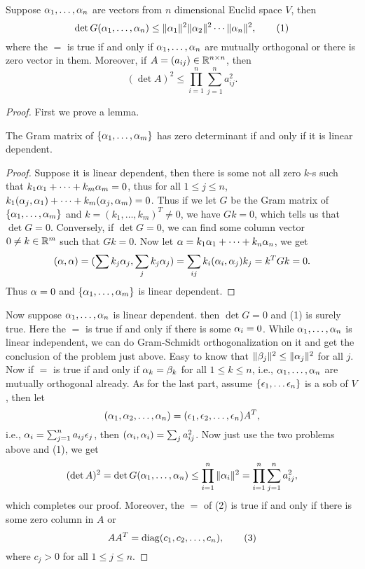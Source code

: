 \begin{pro}%
	Suppose $\alpha_1,\dots,\alpha_n$ are vectors from $n$ dimensional Euclid space $V$, then
	\[\det G(\alpha_1,\dots,\alpha_n)\leq \|\alpha_1\|^2\|\alpha_2\|^2\cdots\|\alpha_n\|^2,\tag{1}\]
	where the $=$ is true if and only if $\alpha_1,\dots,\alpha_n$ are mutually orthogonal or there is zero vector in them. Moreover, if $A=(a_{ij})\in \mathbb{R}^{n\times n}$, then
	\[(\det A)^2\leq \prod_{i=1}^n\sum_{j=1}^n a_{ij}^2.\tag{2}\]
\end{pro}
\begin{proof}
	First we prove a lemma.
	\begin{lem}
		The Gram matrix of $\{\alpha_1,\dots,\alpha_m\}$ has zero determinant if and only if it is linear dependent.
	\end{lem}
	\begin{proof}
		Suppose it is linear dependent, then there is some not all zero $k$-s such that $k_1\alpha_1+\dots+k_m\alpha_m=0$, thus for all $1\leq j\leq n$, $k_1(\alpha_j,\alpha_1)+\dots+k_m(\alpha_j,\alpha_m)=0$. Thus if we let $G$ be the Gram matrix of $\{\alpha_1,\dots,\alpha_m\}$ and $k=(k_1,\dots,k_m)^T\neq 0$, we have $Gk=0$, which tells us that $\det G=0$. Conversely, if $\det G=0$, we can find some column vector $0\neq k\in \mathbb{R}^m$ such that $Gk=0$. Now let $\alpha=k_1\alpha_1+\dots+k_n\alpha_n$, we get 
		\[(\alpha,\alpha)=(\sum k_j \alpha_j,\sum_j k_j \alpha_j)=\sum_{ij} k_i(\alpha_i,\alpha_j)k_j=k^TGk=0.\]
		Thus $\alpha=0$ and $\{\alpha_1,\dots,\alpha_m\}$ is linear dependent.
	\end{proof}
	Now suppose $\alpha_1,\dots,\alpha_n$ is linear dependent. then $\det G=0$ and (1) is surely true. Here the $=$ is true if and only if there is some $\alpha_i=0$. While $\alpha_1,\dots,\alpha_n$ is linear independent, we can do Gram-Schmidt orthogonalization on it and get the conclusion of the problem just above. Easy to know that $\|\beta_j\|^2\leq \|\alpha_j\|^2$ for all $j$. Now if $=$ is true if and only if $\alpha_k=\beta_k$ for all $1\leq k\leq n$, i.e., $\alpha_1,\dots,\alpha_n$ are mutually orthogonal already. As for the last part, assume $\{\epsilon_1,\dots\epsilon_n\}$ is a sob of $V$, then let
	\[(\alpha_1,\alpha_2,\dots,\alpha_n)=(\epsilon_1,\epsilon_2,\dots,\epsilon_n)A^T,\]
	i.e., $\alpha_i=\sum_{j=1}^n a_{ij} \epsilon_j$, then $(\alpha_i,\alpha_i)=\sum_j a_{ij}^2$. Now just use the two problems above and (1), we get  
	\[(\det A)^2=\det G(\alpha_1,\dots,\alpha_n)\leq \prod_{i=1}^n \|\alpha_i\|^2=\prod_{i=1}^n\sum_{j=1}^n a_{ij}^2,\]
	which completes our proof. Moreover, the $=$ of (2) is true if and only if there is some zero column in $A$ or 
	\[AA^T=\operatorname*{diag}(c_1,c_2,\dots,c_n),\tag{3}\]
	where $c_j>0$ for all $1\leq j \leq n$.
\end{proof}

